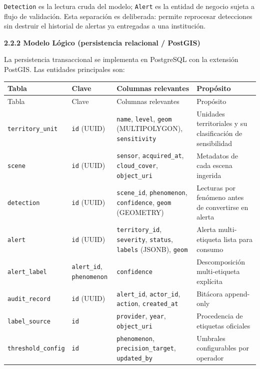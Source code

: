 \documentclass{article}
\newcommand{\mdhfour}[1]{\par\medskip\noindent\textbf{#1}\par\nobreak\smallskip}
\begin{document}
\texttt{Detection} es la lectura cruda del modelo; \texttt{Alert} es la entidad de negocio sujeta a flujo de validación. Esta separación es deliberada: permite reprocesar detecciones sin destruir el historial de alertas ya entregadas a una institución.

\mdhfour{2.2.2 Modelo Lógico (persistencia relacional / PostGIS)}

La persistencia transaccional se implementa en PostgreSQL con la extensión PostGIS. Las entidades principales son:

{\small
\begin{longtable}{@{}L{0.67in}L{0.75in}L{2.23in}L{2.29in}@{}}
\toprule
Tabla & Clave & Columnas relevantes & Propósito \\
\midrule
\endfirsthead
\toprule
Tabla & Clave & Columnas relevantes & Propósito \\
\midrule
\endhead
\bottomrule
\endlastfoot
\texttt{territory\_\allowbreak{}unit} & \texttt{id} (UUID) & \texttt{name}, \texttt{level}, \texttt{geom} (MULTIPOLYGON), \texttt{sensitivity} & Unidades territoriales y su clasificación de sensibilidad \\
\texttt{scene} & \texttt{id} (UUID) & \texttt{sensor}, \texttt{acquired\_\allowbreak{}at}, \texttt{cloud\_\allowbreak{}cover}, \texttt{object\_\allowbreak{}uri} & Metadatos de cada escena ingerida \\
\texttt{detection} & \texttt{id} (UUID) & \texttt{scene\_\allowbreak{}id}, \texttt{phenomenon}, \texttt{confidence}, \texttt{geom} (GEOMETRY) & Lecturas por fenómeno antes de convertirse en alerta \\
\texttt{alert} & \texttt{id} (UUID) & \texttt{territory\_\allowbreak{}id}, \texttt{severity}, \texttt{status}, \texttt{labels} (JSONB), \texttt{geom} & Alerta multi-etiqueta lista para consumo \\
\texttt{alert\_\allowbreak{}label} & \texttt{alert\_\allowbreak{}id}, \texttt{phenomenon} & \texttt{confidence} & Descomposición multi-etiqueta explícita \\
\texttt{audit\_\allowbreak{}record} & \texttt{id} (UUID) & \texttt{alert\_\allowbreak{}id}, \texttt{actor\_\allowbreak{}id}, \texttt{action}, \texttt{created\_\allowbreak{}at} & Bitácora append-only \\
\texttt{label\_\allowbreak{}source} & \texttt{id} & \texttt{provider}, \texttt{year}, \texttt{object\_\allowbreak{}uri} & Procedencia de etiquetas oficiales \\
\texttt{threshold\_\allowbreak{}config} & \texttt{id} & \texttt{phenomenon}, \texttt{precision\_\allowbreak{}target}, \texttt{updated\_\allowbreak{}by} & Umbrales configurables por operador \\
\end{longtable}
}
\end{document}
